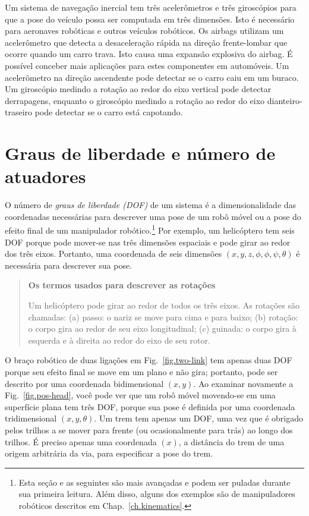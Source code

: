 {Um sistema de navegação inercial tem três acelerômetros e três giroscópios para que a pose do veículo possa ser computada em três dimensões. Isto é necessário para aeronaves robóticas e outros veículos robóticos. Os airbags utilizam um acelerômetro que detecta a desaceleração rápida na direção frente-lombar que ocorre quando um carro trava. Isto causa uma expansão explosiva do airbag. É possível conceber mais aplicações para estes componentes em automóveis. Um acelerômetro na direção ascendente pode detectar se o carro caiu em um buraco. Um giroscópio medindo a rotação ao redor do eixo vertical pode detectar derrapagens, enquanto o giroscópio medindo a rotação ao redor do eixo dianteiro-traseiro pode detectar se o carro está capotando.


\section{Graus de liberdade e número de atuadores}\label{s.dof}

O número de \emph{graus de liberdade (DOF)} de um sistema é a dimensionalidade das coordenadas necessárias para descrever uma pose de um robô móvel ou a pose do efeito final de um manipulador robótico.\footnote{Esta seção e as seguintes são mais avançadas e podem ser puladas durante sua primeira leitura. Além disso, alguns dos exemplos são de manipuladores robóticos descritos em Chap.~\ref{ch.kinematics}.} Por exemplo, um helicóptero tem seis DOF porque pode mover-se nas três dimensões espaciais e pode girar ao redor dos três eixos. Portanto, uma coordenada de seis dimensões $(x,y,z,\phi,\phi,\psi,\theta)$ é necessária para descrever sua pose.

\begin{quote}
\begin{center}
\textbf{Os termos usados para descrever as rotações}
\end{center}
Um helicóptero pode girar ao redor de todos os três eixos. As rotações são chamadas: (a) passo: o nariz se move para cima e para baixo; (b) rotação: o corpo gira ao redor de seu eixo longitudinal; (c) guinada: o corpo gira à esquerda e à direita ao redor do eixo de seu rotor.
\end{quote}

O braço robótico de duas ligações em Fig.~\ref{fig.two-link} tem apenas duas DOF porque seu efeito final se move em um plano e não gira; portanto, pode ser descrito por uma coordenada bidimensional $(x,y)$. Ao examinar novamente a Fig.~\ref{fig.pos-head}, você pode ver que um robô móvel movendo-se em uma superfície plana tem três DOF, porque sua pose é definida por uma coordenada tridimensional $(x,y,\theta)$. Um trem tem apenas um DOF, uma vez que é obrigado pelos trilhos a se mover para frente (ou ocasionalmente para trás) ao longo dos trilhos. É preciso apenas uma coordenada $(x)$, a distância do trem de uma origem arbitrária da via, para especificar a pose do trem.

}
